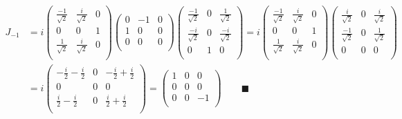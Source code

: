 \documentclass{article}
\begin{document}
\begin{align*}
  J_{-1} & =i\begin{pmatrix}
    \frac{-1}{\sqrt{2}} & \frac{i}{\sqrt{2}} & 0 \\
    0                   & 0                  & 1 \\
    \frac{1}{\sqrt{2}}  & \frac{i}{\sqrt{2}} & 0 \\
  \end{pmatrix}\begin{pmatrix}
    0 & -1 & 0 \\
    1 & 0  & 0 \\
    0 & 0  & 0 \\
  \end{pmatrix}\begin{pmatrix}
    \frac{-1}{\sqrt{2}} & 0 & \frac{1}{\sqrt{2}}  \\
    \frac{-i}{\sqrt{2}} & 0 & \frac{-i}{\sqrt{2}} \\
    0                   & 1 & 0                   \\
  \end{pmatrix}=i\begin{pmatrix}
    \frac{-1}{\sqrt{2}} & \frac{i}{\sqrt{2}} & 0 \\
    0                   & 0                  & 1 \\
    \frac{1}{\sqrt{2}}  & \frac{i}{\sqrt{2}} & 0 \\
  \end{pmatrix}\begin{pmatrix}
    \frac{i}{\sqrt{2}}  & 0 & \frac{i}{\sqrt{2}} \\
    \frac{-1}{\sqrt{2}} & 0 & \frac{1}{\sqrt{2}} \\
    0                   & 0 & 0                  \\
  \end{pmatrix} \\
         & =i\begin{pmatrix}
    -\frac{i}{2}-\frac{i}{2} & 0 & -\frac{i}{2}+\frac{i}{2} \\
    0                        & 0 & 0                        \\
    \frac{i}{2}-\frac{i}{2}  & 0 & \frac{i}{2}+\frac{i}{2}  \\
  \end{pmatrix}=\begin{pmatrix}
    1 & 0 & 0  \\
    0 & 0 & 0  \\
    0 & 0 & -1 \\
  \end{pmatrix}\qquad\blacksquare
\end{align*}
\end{document}
